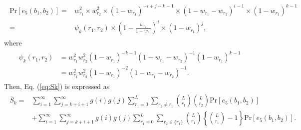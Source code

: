 \begin{align}\begin{split}
  \mathrm{Pr}[e_5(b_1,b_2)]
  =& w_{r_1}^2  \times w_{r_2}^2 
  \times (1-w_{r_1})^{-i+j-k-1} 
  \times (1-w_{r_1}-w_{r_2})^{i-1}
  \times (1-w_{r_1})^{k-1} \\
  =&\psi_k(r_1,r_2)\times \left(1-\frac{w_{r_2}}{1-w_{r_1}} \right)^{i} \times (1-w_{r_1})^j,
\end{split}\end{align}
%
where
\begin{align}\begin{split}\label{eq:psi_k}
  \psi_k(r_1,r_2) 
  &= w_{r_1}^2 w_{r_2}^2 
    (1-w_{r_1})^{-k-1} 
    (1-w_{r_1}-w_{r_2})^{-1}
    (1-w_{r_1})^{k-1} \\
  &= w_{r_1}^2 w_{r_2}^2 (1-w_{r_1})^{-2} (1-w_{r_1}-w_{r_2})^{-1}.
\end{split}\end{align}
%
Then, Eq. (\ref{eq:Sk}) is expressed as
\begin{align}\begin{split}\label{eq:Sk_case5}
  \overline{S}_k 
  =& \sum_{i=1}^{\infty}\sum_{j=k+i+1}^{\infty} g(i)g(j) \sum_{r_1=0}^{L} \sum_{r_2 \neq r_1} \binom{L}{r_1}\binom{L}{r_2}\mathrm{Pr}[e_5(b_1,b_2)]\\ 
  &+ \sum_{i=1}^{\infty}\sum_{j=k+i+1}^{\infty} g(i)g(j) \sum_{r_1=0}^{L} \sum_{r_2 \in \{r_1\}} \binom{L}{r_1} \left\{\binom{L}{r_1}-1 \right\}\mathrm{Pr}[e_5(b_1,b_2)].
\end{split}\end{align}
